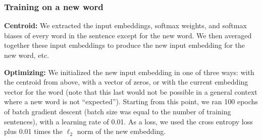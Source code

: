 \documentclass{article}
\begin{document}
\subsubsection{Training on a new word} 
\textbf{Centroid:} We extracted the input embeddings, softmax weights, and softmax biases of every word in the sentence except for the new word. We then averaged together these input embeddings to produce the new input embedding for the new word, etc. \par
\textbf{Optimizing:} We initialized the new input embedding in one of three ways: with the centroid from above, with a vector of zeros, or with the current embedding vector for the word (note that this last would not be possible in a general context where a new word is not ``expected''). Starting from this point, we ran 100 epochs of batch gradient descent (batch size was equal to the number of training sentences), with a learning rate of 0.01. As a loss, we used the cross entropy loss plus 0.01 times the \(\ell_2\) norm of the new embedding.\par 
\end{document}
